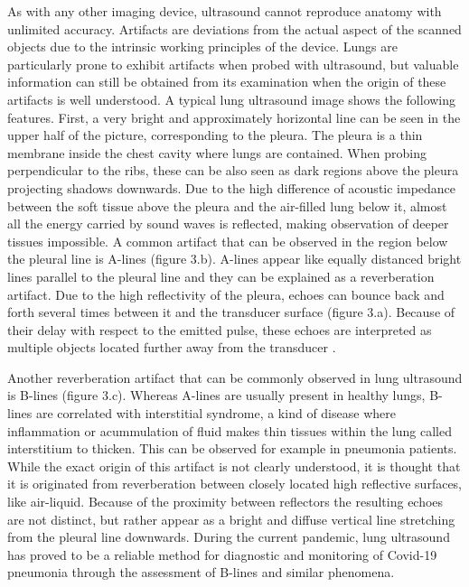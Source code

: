 \documentclass[11pt]{article} %
\begin{document}
	As with any other imaging device, ultrasound cannot reproduce anatomy with unlimited accuracy. Artifacts are deviations from the actual aspect of the scanned objects due to the intrinsic working principles of the device. Lungs are particularly prone to exhibit artifacts when probed with ultrasound, but valuable information can still be obtained from its examination when the origin of these artifacts is well understood. A typical lung ultrasound image shows the following features. First, a very bright and approximately horizontal line can be seen in the upper half of the picture, corresponding to the pleura. The pleura is a thin membrane inside the chest cavity where lungs are contained. When probing perpendicular to the ribs, these can be also seen as dark regions above the pleura projecting shadows downwards. Due to the high difference of acoustic impedance between the soft tissue above the pleura and the air-filled lung below it, almost all the energy carried by sound waves is reflected, making observation of deeper tissues impossible. A common artifact that can be observed in the region below the pleural line is A-lines (figure 3.b). A-lines appear like equally distanced bright lines parallel to the pleural line and they can be explained as a reverberation artifact. Due to the high reflectivity of the pleura, echoes can bounce back and forth several times between it and the transducer surface (figure 3.a). Because of their delay with respect to the emitted pulse, these echoes are interpreted as multiple objects located further away from the transducer \cite{artifacts}.

	
	Another reverberation artifact that can be commonly observed in lung ultrasound is B-lines (figure 3.c). Whereas A-lines are usually present in healthy lungs, B-lines are correlated with interstitial syndrome, a kind of disease where inflammation or acummulation of fluid makes thin tissues within the lung called interstitium to thicken. This can be observed for example in pneumonia patients. While the exact origin of this artifact is not clearly understood, it is thought that it is originated from reverberation between closely located high reflective surfaces, like air-liquid. Because of the proximity between reflectors the resulting echoes are not distinct, but rather appear as a bright and diffuse vertical line stretching from the pleural line downwards. During the current pandemic, lung ultrasound has proved to be a reliable method for diagnostic and monitoring of Covid-19 pneumonia through the assessment of B-lines and similar phenomena.
	
\end{document}

